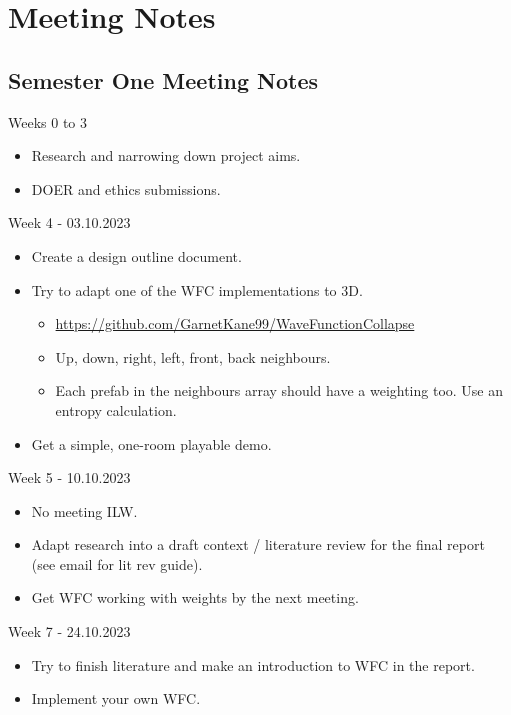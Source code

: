 \chapter{Meeting Notes}\label{sec:meeting_notes}
\section{Semester One Meeting Notes}
\label{sec:semester_one_meeting_notes}
\noindent Weeks 0 to 3
\begin{itemize}
    \item Research and narrowing down project aims.
    \item DOER and ethics submissions.
\end{itemize}
\noindent Week 4 - 03.10.2023
\begin{itemize}
    \item Create a design outline document.
    \item Try to adapt one of the WFC implementations to 3D.
          \begin{itemize}
              \item \url{https://github.com/GarnetKane99/WaveFunctionCollapse}
              \item Up, down, right, left, front, back neighbours.
              \item Each prefab in the neighbours array should have a weighting too. Use an entropy calculation.
          \end{itemize}
    \item Get a simple, one-room playable demo.
\end{itemize}

\noindent Week 5 - 10.10.2023
\begin{itemize}
    \item No meeting ILW.
    \item Adapt research into a draft context / literature review for the final report (see email for lit rev guide).
    \item Get WFC working with weights by the next meeting.
\end{itemize}

\noindent Week 7 - 24.10.2023
\begin{itemize}
    \item Try to finish literature and make an introduction to WFC in the report.
    \item Implement your own WFC.
\end{itemize}

